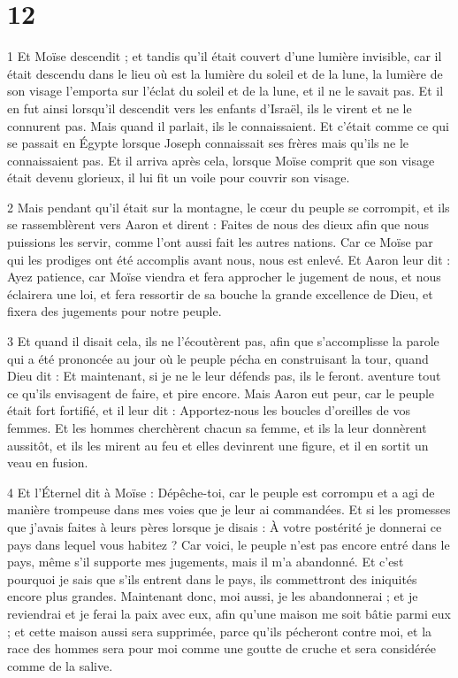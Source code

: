 \chapter{12}

\par 1 Et Moïse descendit ; et tandis qu'il était couvert d'une lumière invisible, car il était descendu dans le lieu où est la lumière du soleil et de la lune, la lumière de son visage l'emporta sur l'éclat du soleil et de la lune, et il ne le savait pas. Et il en fut ainsi lorsqu'il descendit vers les enfants d'Israël, ils le virent et ne le connurent pas. Mais quand il parlait, ils le connaissaient. Et c'était comme ce qui se passait en Égypte lorsque Joseph connaissait ses frères mais qu'ils ne le connaissaient pas. Et il arriva après cela, lorsque Moïse comprit que son visage était devenu glorieux, il lui fit un voile pour couvrir son visage.

\par 2 Mais pendant qu'il était sur la montagne, le cœur du peuple se corrompit, et ils se rassemblèrent vers Aaron et dirent : Faites de nous des dieux afin que nous puissions les servir, comme l'ont aussi fait les autres nations. Car ce Moïse par qui les prodiges ont été accomplis avant nous, nous est enlevé. Et Aaron leur dit : Ayez patience, car Moïse viendra et fera approcher le jugement de nous, et nous éclairera une loi, et fera ressortir de sa bouche la grande excellence de Dieu, et fixera des jugements pour notre peuple.

\par 3 Et quand il disait cela, ils ne l'écoutèrent pas, afin que s'accomplisse la parole qui a été prononcée au jour où le peuple pécha en construisant la tour, quand Dieu dit : Et maintenant, si je ne le leur défends pas, ils le feront. aventure tout ce qu'ils envisagent de faire, et pire encore. Mais Aaron eut peur, car le peuple était fort fortifié, et il leur dit : Apportez-nous les boucles d'oreilles de vos femmes. Et les hommes cherchèrent chacun sa femme, et ils la leur donnèrent aussitôt, et ils les mirent au feu et elles devinrent une figure, et il en sortit un veau en fusion.

\par 4 Et l'Éternel dit à Moïse : Dépêche-toi, car le peuple est corrompu et a agi de manière trompeuse dans mes voies que je leur ai commandées. Et si les promesses que j'avais faites à leurs pères lorsque je disais : À votre postérité je donnerai ce pays dans lequel vous habitez ? Car voici, le peuple n'est pas encore entré dans le pays, même s'il supporte mes jugements, mais il m'a abandonné. Et c'est pourquoi je sais que s'ils entrent dans le pays, ils commettront des iniquités encore plus grandes. Maintenant donc, moi aussi, je les abandonnerai ; et je reviendrai et je ferai la paix avec eux, afin qu'une maison me soit bâtie parmi eux ; et cette maison aussi sera supprimée, parce qu'ils pécheront contre moi, et la race des hommes sera pour moi comme une goutte de cruche et sera considérée comme de la salive.

